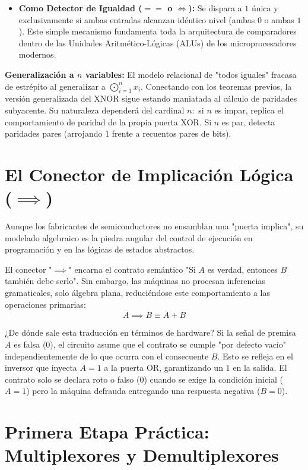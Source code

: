 \begin{itemize}
    \item \textbf{Como Detector de Igualdad ($==$ o $\iff$):} Se dispara a $1$ única y exclusivamente si ambas entradas alcanzan idéntico nivel (ambas $0$ o ambas $1$). Este simple mecanismo fundamenta toda la arquitectura de comparadores dentro de las Unidades Aritmético-Lógicas (ALUs) de los microprocesadores modernos.
\end{itemize}

\textbf{Generalización a $n$ variables:} El modelo relacional de "todos iguales" fracasa de estrépito al generalizar a $\bigodot_{i=1}^{n} x_i.$ Conectando con los teoremas previos, la versión generalizada del XNOR sigue estando maniatada al cálculo de paridades subyacente. Su naturaleza dependerá del cardinal $n:$ si $n$ es impar, replica el comportamiento de paridad de la propia puerta XOR. Si $n$ es par, detecta paridades pares (arrojando $1$ frente a recuentos pares de bits).

\section{El Conector de Implicación Lógica ($\implies$)}

Aunque los fabricantes de semiconductores no ensamblan una "puerta implica", su modelado algebraico es la piedra angular del control de ejecución en programación y en las lógicas de estados abstractos. 

El conector "$\implies$" encarna el contrato semántico "Si $A$ es verdad, entonces $B$ también debe serlo". Sin embargo, las máquinas no procesan inferencias gramaticales, solo álgebra plana, reduciéndose este comportamiento a las operaciones primarias:
\[ A \implies B \equiv \overline{A} + B \]

¿De dónde sale esta traducción en términos de hardware? Si la señal de premisa $A$ es falsa ($0$), el circuito asume que el contrato se cumple "por defecto vacío" independientemente de lo que ocurra con el consecuente $B.$ Esto se refleja en el inversor que inyecta $\overline{A} = 1$ a la puerta OR, garantizando un $1$ en la salida. El contrato solo se declara roto o falso ($0$) cuando se exige la condición inicial ($A=1$) pero la máquina defrauda entregando una respuesta negativa ($B=0$).

\section{Primera Etapa Práctica: Multiplexores y Demultiplexores}

